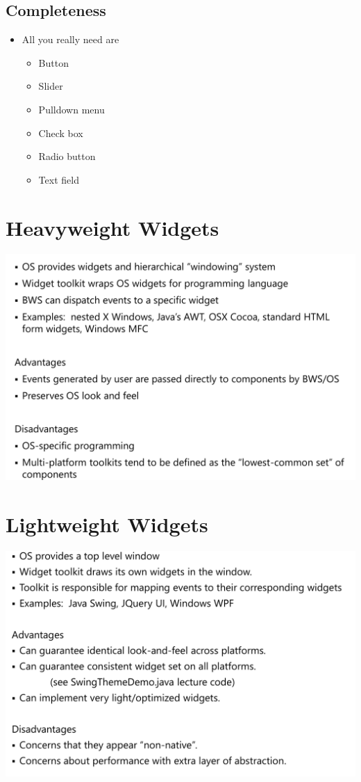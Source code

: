 \documentclass[twoside]{article}
\begin{document}
\subsection{Completeness}
\begin{itemize}
\item All you really need are
\begin{itemize}
\item Button 
\item Slider
\item Pulldown menu
\item Check box
\item Radio button 
\item Text field
\end{itemize}
\end{itemize}

\section{Heavyweight Widgets}
\begin{center}
\includegraphics[scale=0.2]{22}\end{center}

\section{Lightweight Widgets}
\begin{center}
\includegraphics[scale=0.2]{23}\end{center}
\end{document}

